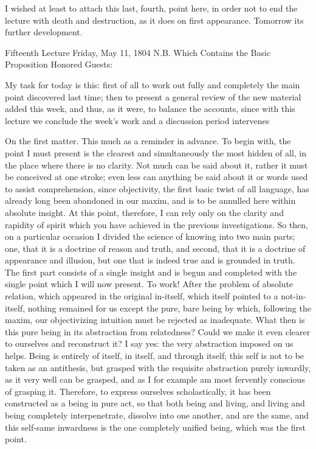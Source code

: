I wished at least to attach this last, fourth, point here,
in order not to end the lecture with death and destruction,
as it does on first appearance.
Tomorrow its further development.

Fifteenth Lecture
Friday, May 11, 1804
N.B. Which Contains the Basic Proposition
Honored Guests:

My task for today is this:
first of all to work out fully and completely
the main point discovered last time;
then to present a general review of
the new material added this week,
and thus, as it were, to balance the accounts,
since with this lecture we conclude the week's work
and a discussion period intervenes

On the first matter.
This much as a reminder in advance.
To begin with, the point I must present is
the clearest and simultaneously the most hidden of all,
in the place where there is no clarity.
Not much can be said about it,
rather it must be conceived at one stroke;
even less can anything be said about it
or words used to assist comprehension,
since objectivity, the first basic twist of all language,
has already long been abandoned in our maxim,
and is to be annulled here within absolute insight.
At this point, therefore, I can rely only
on the clarity and rapidity of spirit
which you have achieved in the previous investigations.
So then, on a particular occasion I divided
the science of knowing into two main parts;
one, that it is a doctrine of reason and truth,
and second, that it is a doctrine of appearance and illusion,
but one that is indeed true and is grounded in truth.
The first part consists of a single insight and is begun
and completed with the single point which I will now present.
To work!
After the problem of absolute relation,
which appeared in the original in-itself,
which itself pointed to a not-in-itself,
nothing remained for us except
the pure, bare being by which, following the maxim,
our objectivizing intuition must be rejected as inadequate.
What then is this pure being in its abstraction from relatedness?
Could we make it even clearer to ourselves and reconstruct it?
I say yes: the very abstraction imposed on us helps.
Being is entirely of itself, in itself, and through itself;
this self is not to be taken as an antithesis,
but grasped with the requisite abstraction purely inwardly,
as it very well can be grasped,
and as I for example am most fervently conscious of grasping it.
Therefore, to express ourselves scholastically,
it has been constructed as a being in pure act,
so that both being and living, and living and being
completely interpenetrate, dissolve into one another,
and are the same, and this self-same inwardness is
the one completely unified being,
which was the first point.

